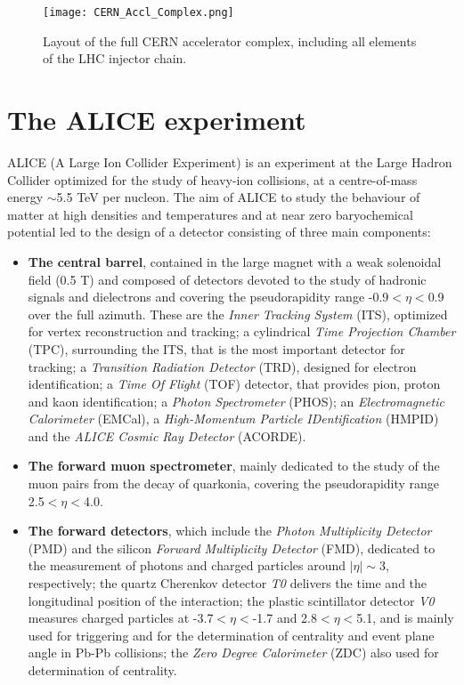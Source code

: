 \begin{figure}[!t]
\centering
\texttt{[image: CERN\_Accl\_Complex.png]}
\caption{Layout of the full CERN accelerator complex, including all elements of the LHC injector chain.}
\label{fig:imageLHC}
\end{figure} 
\section{The ALICE experiment}
ALICE (A Large Ion Collider Experiment) \cite{ALICEperf-May2014} is an experiment at the Large Hadron Collider optimized for the study of heavy-ion collisions, at a centre-of-mass energy $\sim$5.5 TeV per nucleon.
The aim of ALICE to study the behaviour of matter at high densities and temperatures and at near zero baryochemical potential led to the design of a detector consisting of three main components: 
\begin{itemize}
\item \textbf{The central barrel}, contained in the large magnet with a weak solenoidal field (0.5 T) and composed of detectors devoted to the study of hadronic signals and dielectrons and covering the pseudorapidity range -0.9$< \eta <$0.9 over the full azimuth. These are the \textit{Inner Tracking System} (ITS), optimized for vertex reconstruction and tracking; a cylindrical \textit{Time Projection Chamber} (TPC), surrounding the ITS, that is the most important detector for tracking; a \textit{Transition Radiation Detector} (TRD), designed for electron identification; a \textit{Time Of Flight} (TOF) detector, that provides pion, proton and kaon identification; a \textit{Photon Spectrometer} (PHOS); an \textit{Electromagnetic Calorimeter} (EMCal), a \textit{High-Momentum Particle IDentification} (HMPID) and the \textit{ALICE Cosmic Ray Detector} (ACORDE).
\item \textbf{The forward muon spectrometer}, mainly dedicated to the study of the muon pairs from the decay of quarkonia, covering the pseudorapidity range 2.5$< \eta <$4.0.
\item \textbf{The forward detectors}, which include the \textit{Photon Multiplicity Detector} (PMD) and the silicon \textit{Forward Multiplicity Detector} (FMD), dedicated to the measurement of photons and charged particles around $|\eta| \sim 3$, respectively; the quartz Cherenkov detector \textit{T0} delivers the time and the longitudinal position of the interaction; the plastic scintillator detector \textit{V0} measures charged particles at -3.7$< \eta <$-1.7 and 2.8$< \eta <$5.1, and is mainly used for triggering and for the determination of centrality and event plane angle in Pb-Pb collisions; the \textit{Zero Degree Calorimeter} (ZDC) also used for determination of centrality.
\end{itemize}
